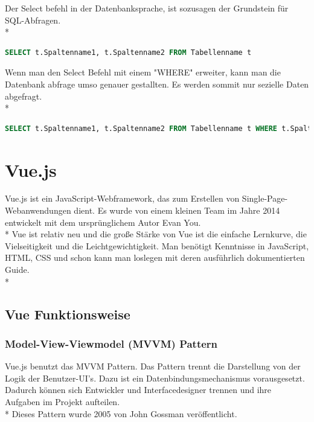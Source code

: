 Der Select befehl in der Datenbanksprache, ist sozusagen der Grundstein für SQL-Abfragen.  \\*

\begin{lstlisting}[language=SQL,caption=Sql Select,label=lst:impl:foo]
SELECT t.Spaltenname1, t.Spaltenname2 FROM Tabellenname t
\end{lstlisting}

Wenn man den Select Befehl mit einem "WHERE" erweiter, kann man die Datenbank abfrage umso genauer gestallten. Es werden sommit nur sezielle Daten abgefragt. \\*

\begin{lstlisting}[language=SQL,caption=Sql Select Where,label=lst:impl:foo]
SELECT t.Spaltenname1, t.Spaltenname2 FROM Tabellenname t WHERE t.Spaltenname1 = 1
\end{lstlisting}
    

\section{Vue.js}
\author{Benjamin Besic}
Vue.js ist ein JavaScript-Webframework, das zum Erstellen von Single-Page-Webanwendungen dient. 
Es wurde von einem kleinen Team im Jahre 2014 entwickelt mit dem ursprünglichem Autor Evan You.\\* Vue ist relativ neu und die große Stärke
von Vue ist die einfache Lernkurve, die Vielseitigkeit und die Leichtgewichtigkeit. Man benötigt Kenntnisse in JavaScript, HTML, CSS und schon kann man loslegen
mit deren ausführlich dokumentierten Guide\cite{VueGuide}. \cite{VueWissen} \cite{VueWiki}\\*

\subsection{Vue Funktionsweise}

\subsubsection{Model-View-Viewmodel (MVVM) Pattern }
Vue.js benutzt das MVVM Pattern. Das Pattern trennt die Darstellung von der Logik der Benutzer-UI's.
Dazu ist ein Datenbindungsmechanismus vorausgesetzt. Dadurch können sich Entwickler und Interfacedesigner trennen und ihre Aufgaben im Projekt 
aufteilen. \\*
Dieses Pattern wurde 2005 von John Gossman veröffentlicht. \cite{MVVM}

